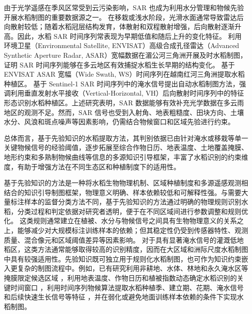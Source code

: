 由于光学遥感在季风区常受到云污染影响，SAR 也成为利用水分管理和物候先验开展水稻制图的重要数据源之一。
在移栽或浅水阶段，光滑水面通常导致雷达后向散射较低；随着水稻冠层结构发育，体散射和双程散射增强，后向散射逐渐升高。因此，水稻 SAR 时间序列常表现为早期低值和随后上升的变化特征。\citet{Bouvet2011RSE} 利用环境卫星（Environmental Satellite, ENVISAT）高级合成孔径雷达（Advanced Synthetic Aperture Radar, ASAR）宽幅数据在湄公河三角洲开展及时水稻制图，证明 SAR 时间序列能够在多云地区有效捕捉水稻生长早期的结构变化。\citet{Nguyen2015ISPRSArchives} 基于 ENVISAT ASAR 宽幅（Wide Swath, WS）时间序列在越南红河三角洲提取水稻种植区。\citet{Zhan2021} 基于 Sentinel-1 SAR 时间序列中的淹水信号提出自动水稻制图方法，强调利用垂直发射水平接收（Vertical-Horizontal, VH）后向散射时间序列中的特征形态识别水稻种植区。上述研究表明，SAR 数据能够有效补充光学数据在多云雨地区的观测不足。然而，SAR 信号也受到入射角、地表粗糙度、田块方向、土壤水分、风浪和斑点噪声等因素影响，仍需结合物候窗口和区域先验进行约束。

总体而言，基于先验知识的水稻提取方法，其判别依据已由针对淹水或移栽等单一关键物候信号的经验阈值，逐步拓展至综合作物日历、地表温度、土地覆盖掩膜、地形约束和多熟制物候曲线等信息的多源知识引导框架，丰富了水稻识别的约束维度，有助于增强方法在不同生态区和种植制度下的适用性\cite{Dong2015RSE,Dong2016RSEGEE,Sun2023SEAsiaRice20m,Zhao2024OpticalRadar}。

基于先验知识的方法是一种将水稻生物物理机制、区域种植制度和多源遥感观测相结合的知识引导制图框架，物理意义明确、样本依赖较低和可解释性强。与需要大量标注样本的监督分类方法不同，基于先验知识的方法通过明确的物理规则识别水稻，分类过程和判定依据对研究者透明，便于在不同区域间进行参数调整和规则优化。
这类规则通常建立在植被、水分与物候信号之间具有生物物理意义的关系之上，能够减少对大规模标注训练样本的依赖；但其稳定性仍受到传感器特性、观测质量、混合像元和区域阈值差异等因素影响\cite{Dong2016}。
对于具有显著淹水信号的灌溉低地稻区，这类方法通常能够取得较高的识别精度，因而在大区域和洲际尺度水稻制图中具有较强适用性。先验知识既可独立用于规则化水稻制图，也可作为知识约束嵌入更复杂的制图流程中。例如，已有研究利用非耕地、水体、林地和永久淹水区等掩膜限定候选区域 \citep{Wang2015SciRep}，利用地表温度、作物日历和植被指数动态确定水稻识别的关键时间窗口 \citep{Wang2015SciRep,Zhang2015ISPRS,Zhou2016IJAEO}，利用时间序列物候算法提取水稻种植季、建立期、花期、淹水信号和后续快速生长信号等特征 \citep{Boschetti2017RSE,Zhao2024OpticalRadar}，并在弱化或避免地面训练样本依赖的条件下实现水稻制图\citep{Zhan2021,Zhao2024OpticalRadar}。

